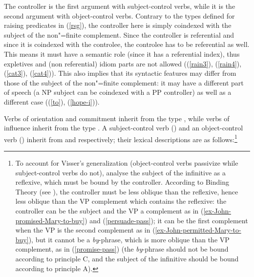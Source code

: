 The controller is the first argument with subject-control verbs, while it is the second argument
with object-control verbs. Contrary to the types defined for raising predicates in (\ref{rsg}), the
controller here is simply coindexed with the subject of the non"=finite complement. Since the
controller is referential and since it is coindexed with the controlee, the controlee has to be
referential as well. This means it must have a semantic role (since it has a referential index),
thus expletives and (non referential) idiom parts are not allowed ((\ref{rain3}), (\ref{rain4}),
(\ref{cat3}), (\ref{cat4})). This also implies that its syntactic features may differ from those of
the subject of the non"=finite complement: it may have a different part of speech (a NP subject can
be coindexed with a PP controller) as well as a different case ((\ref{to}), (\ref{hope-i})).

Verbs of orientation and commitment inherit from the type , while verbs of
influence inherit from the type .  A subject-control verb () and an
object-control verb () inherit from  and 
respectively; their lexical descriptions are as follows:\footnote{To account for Visser's
  generalization (object-control verbs passivize while subject-control verbs do not),
  \citet{SagandPollard1991} analyse the subject of the infinitive as a reflexive, which must be
  bound by the controller. According to Binding Theory (see ), the
  controller must be less oblique than the reflexive, hence less oblique than the VP complement
  which contains the reflexive: the controller can be the subject and the VP a complement as in
  (\ref{ex-John-promised-Mary-to-buy}) and (\ref{persuade-pass}); it can be the first complement
  when the VP is the second complement as in (\ref{ex-John-permitted-Mary-to-buy}), but it cannot be
  a \emph{by}-phrase, which is more oblique than the VP complement, as in (\ref{promise-pass}) (the
  \emph{by}-phrase should not be bound according to principle C, and the subject of the infinitive
  should be bound according to principle A).
}


